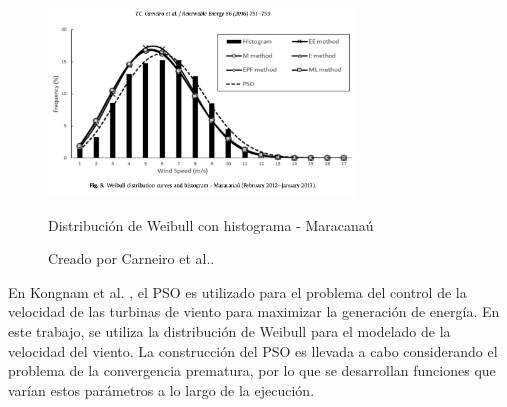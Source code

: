 \begin{figure}[h!]
    \centering    
    \includegraphics[height=50mm]{figures/pso_fit.png} 
    \caption{Distribución de Weibull con histograma - Maracanaú}
    \vspace{-.25cm} 
    \caption*{Creado por Carneiro et al.\cite{Carneiro15}.}
    \label{fig:pso_fit}
\end{figure}
En Kongnam et al. \cite{Kongnam15}, el PSO es utilizado para el problema del control de la velocidad de las turbinas de viento para maximizar la generación de energía. En este trabajo, se utiliza la distribución de Weibull para el modelado de la velocidad del viento. La construcción del PSO es llevada a cabo considerando el problema de la convergencia prematura, por lo que se desarrollan funciones que varían estos parámetros a lo largo de la ejecución.\\

